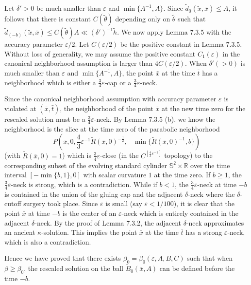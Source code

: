 Let $\delta'>0$ be much smaller than $\varepsilon$ and
$\min\{A^{-1},A\}$. Since $\tilde{d}_0(\tilde{x},\bar{x})\leq A$,
it follows that there is constant $C(\tilde{\theta})$ depending
only on $\tilde{\theta}$ such that
$\tilde{d}_{(-b)}(\tilde{x},\bar{x})\leq C(\tilde{\theta})A \ll
(\delta')^{-1}\tilde{h}$. We now apply Lemma 7.3.5 with the
accuracy parameter ${\varepsilon}/{2}$. Let $C({\varepsilon}/{2})$
be the positive constant in Lemma 7.3.5. Without loss of
generality, we may assume the positive constant $C_1(\varepsilon)$
in the canonical neighborhood assumption is larger than
$4C({\varepsilon}/{2})$.  When $\delta'(>0)$ is much smaller than
$\varepsilon$ and $\min\{A^{-1},A\}$, the point $\bar{x}$ at the
time $\bar{t}$ has a neighborhood which is either a
$\frac{3}{4}\varepsilon$-cap or a $\frac{3}{4}\varepsilon$-neck.

Since the canonical neighborhood assumption with accuracy
parameter $\varepsilon$ is violated at $(\bar{x},\bar{t})$, the
neighborhood of the point $\bar{x}$ at the new time zero for the
rescaled solution must be a $\frac{3}{4}\varepsilon$-neck. By
Lemma 7.3.5 (b), we know the neighborhood is the slice at the time
zero of the parabolic neighborhood
$$
P(\bar{x},0,\frac{4}{3}\varepsilon^{-1}\widetilde{R}
(\bar{x},0)^{-\frac{1}{2}},
-\min\{\widetilde{R}(\bar{x},0)^{-1},b\})
$$
(with $\widetilde{R}(\bar{x},0)=1$) which is
$\frac{3}{4}\varepsilon$-close (in the
$C^{[\frac{4}{3}\varepsilon^{-1}]}$ topology) to the corresponding
subset of the evolving standard cylinder $\mathbb{S}^2 \times
\mathbb{R}$ over the time interval $[-\min \{b,1\},0]$ with scalar
curvature $1$ at the time zero. If $b \geq 1$, the
$\frac{3}{4}\varepsilon$-neck is strong, which is a contradiction.
While if $b<1$, the $\frac{3}{4}\varepsilon$-neck at time $-b$ is
contained in the union of the gluing cap and the adjacent
$\delta$-neck where the $\delta$-cutoff surgery took place. Since
$\varepsilon$ is small (say $\varepsilon< 1/100$), it is clear
that the point $\bar{x}$ at time $-b$ is the center of an
$\varepsilon$-neck which is entirely contained in the adjacent
$\delta$-neck. By the proof of Lemma 7.3.2, the adjacent
$\delta$-neck approximates an ancient $\kappa$-solution. This
implies the point $\bar{x}$ at the time $\bar{t}$ has a strong
$\varepsilon$-neck, which is also a contradiction.

Hence we have proved that there exists $\beta_0=\beta_0(
\varepsilon, A, B, C)$ such that when $\beta\geq\beta_0$, the
rescaled solution on the ball $\widetilde{B}_{0}(\bar{x},A)$ can
be defined before the time $-b$.

